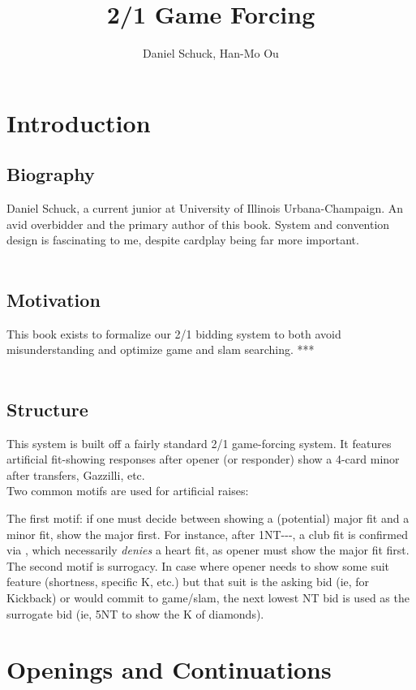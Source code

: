 \documentclass[12pt]{report}
\title{\bf{2/1 Game Forcing}}
\author{Daniel Schuck, Han-Mo Ou}
\newcommand{\n}{\\}
\begin{document}
\maketitle
\newpage

\chapter{Introduction}
\section{Biography}

    Daniel Schuck, a current junior at University of Illinois Urbana-Champaign.  An avid overbidder and the primary author of this book.  System and convention design is fascinating to me, despite cardplay being far more important.
\n\n

\section{Motivation}

    This book exists to formalize our 2/1 bidding system to both avoid misunderstanding and optimize game and slam searching. ***
\n\n

\section{Structure}

    This system is built off a fairly standard 2/1 game-forcing system.  It features artificial fit-showing responses after opener (or responder) show a 4-card minor after transfers, Gazzilli, etc.\n

    Two common motifs are used for artificial raises:
    
    The first motif: if one must decide between showing a (potential) major fit and a minor fit, show the major first. For instance, after 1NT---, a club fit is confirmed via , which necessarily \textit{denies} a heart fit, as opener must show the major fit first.\n

    The second motif is surrogacy.  In case where opener needs to show some suit feature (shortness, specific K, etc.) but that suit is the asking bid (ie,  for \cl{} Kickback) or would commit to game/slam, the next lowest NT bid is used as the surrogate bid (ie, 5NT to show the K of diamonds).

\newpage

\chapter{Openings and Continuations}
\end{document}
